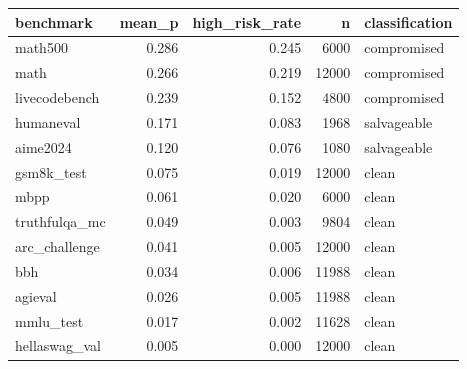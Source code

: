 \begin{tabular}{lrrrl}
\toprule
benchmark & mean_p & high_risk_rate & n & classification \\
\midrule
math500 & 0.286 & 0.245 & 6000 & compromised \\
math & 0.266 & 0.219 & 12000 & compromised \\
livecodebench & 0.239 & 0.152 & 4800 & compromised \\
humaneval & 0.171 & 0.083 & 1968 & salvageable \\
aime2024 & 0.120 & 0.076 & 1080 & salvageable \\
gsm8k_test & 0.075 & 0.019 & 12000 & clean \\
mbpp & 0.061 & 0.020 & 6000 & clean \\
truthfulqa_mc & 0.049 & 0.003 & 9804 & clean \\
arc_challenge & 0.041 & 0.005 & 12000 & clean \\
bbh & 0.034 & 0.006 & 11988 & clean \\
agieval & 0.026 & 0.005 & 11988 & clean \\
mmlu_test & 0.017 & 0.002 & 11628 & clean \\
hellaswag_val & 0.005 & 0.000 & 12000 & clean \\
\bottomrule
\end{tabular}
